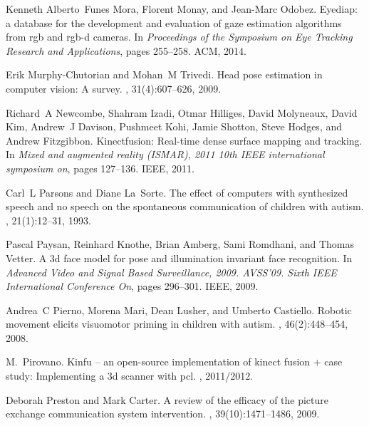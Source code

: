 \documentclass{ut-thesis}
\begin{document}
\begin{thebibliography}{100}
Kenneth Alberto~Funes Mora, Florent Monay, and Jean-Marc Odobez.
\newblock Eyediap: a database for the development and evaluation of gaze
  estimation algorithms from rgb and rgb-d cameras.
\newblock In {\em Proceedings of the Symposium on Eye Tracking Research and
  Applications}, pages 255--258. ACM, 2014.

Erik Murphy-Chutorian and Mohan~M Trivedi.
\newblock Head pose estimation in computer vision: A survey.
, 31(4):607--626, 2009.

Richard~A Newcombe, Shahram Izadi, Otmar Hilliges, David Molyneaux, David Kim,
  Andrew~J Davison, Pushmeet Kohi, Jamie Shotton, Steve Hodges, and Andrew
  Fitzgibbon.
\newblock Kinectfusion: Real-time dense surface mapping and tracking.
\newblock In {\em Mixed and augmented reality (ISMAR), 2011 10th IEEE
  international symposium on}, pages 127--136. IEEE, 2011.

Carl~L Parsons and Diane La~Sorte.
\newblock The effect of computers with synthesized speech and no speech on the
  spontaneous communication of children with autism.
,
  21(1):12--31, 1993.

Pascal Paysan, Reinhard Knothe, Brian Amberg, Sami Romdhani, and Thomas Vetter.
\newblock A 3d face model for pose and illumination invariant face recognition.
\newblock In {\em Advanced Video and Signal Based Surveillance, 2009. AVSS'09.
  Sixth IEEE International Conference On}, pages 296--301. IEEE, 2009.

Andrea~C Pierno, Morena Mari, Dean Lusher, and Umberto Castiello.
\newblock Robotic movement elicits visuomotor priming in children with autism.
, 46(2):448--454, 2008.

M.~Pirovano.
\newblock Kinfu – an open-source implementation of kinect fusion + case
  study: Implementing a 3d scanner with pcl.
, 2011/2012.

Deborah Preston and Mark Carter.
\newblock A review of the efficacy of the picture exchange communication system
  intervention.
,
  39(10):1471--1486, 2009.


\end{thebibliography}
\end{document}
